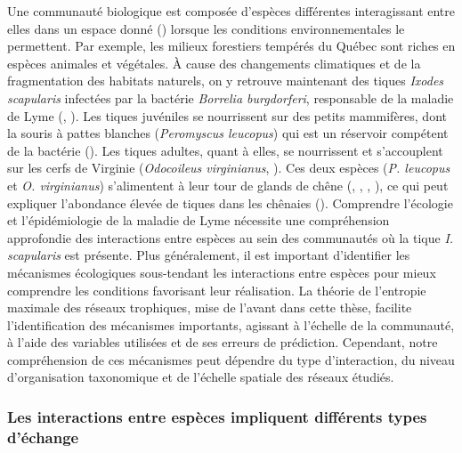 Une communauté biologique est composée d'espèces différentes interagissant entre
elles dans un espace donné (\cite{Stroud2015Community}) lorsque les conditions
environnementales le permettent. Par exemple, les milieux forestiers tempérés du
Québec sont riches en espèces animales et végétales. À cause des changements
climatiques et de la fragmentation des habitats naturels, on y retrouve
maintenant des tiques \textit{Ixodes scapularis} infectées par la bactérie
\textit{Borrelia burgdorferi}, responsable de la maladie de Lyme
(\cite{Ogden2009Emergence}, \cite{Simon2014Climate}). Les tiques juvéniles se
nourrissent sur des petits mammifères, dont la souris à pattes blanches
(\textit{Peromyscus leucopus}) qui est un réservoir compétent de la bactérie
(\cite{Donahue1987Reservoir}). Les tiques adultes, quant à elles, se nourrissent
et s'accouplent sur les cerfs de Virginie (\textit{Odocoileus virginianus},
\cite{Lane1991Lyme}). Ces deux espèces (\textit{P. leucopus} et \textit{O.
virginianus}) s'alimentent à leur tour de glands de chêne
(\cite{McShea1993Variablea}, \cite{Elkinton1996Interactions},
\cite{Wolff1996Population}, \cite{McShea2000Influence}), ce qui peut expliquer
l'abondance élevée de tiques dans les chênaies (\cite{Ostfeld2006Climate}).
Comprendre l'écologie et l'épidémiologie de la maladie de Lyme nécessite une
compréhension approfondie des interactions entre espèces au sein des communautés
où la tique \textit{I. scapularis} est présente. Plus généralement, il est
important d'identifier les mécanismes écologiques sous-tendant les interactions
entre espèces pour mieux comprendre les conditions favorisant leur réalisation.
La théorie de l'entropie maximale des réseaux trophiques, mise de l'avant dans
cette thèse, facilite l'identification des mécanismes importants, agissant à
l'échelle de la communauté, à l'aide des variables utilisées et de ses erreurs
de prédiction. Cependant, notre compréhension de ces mécanismes peut dépendre du
type d'interaction, du niveau d'organisation taxonomique et de l'échelle
spatiale des réseaux étudiés. 

\subsubsection{Les interactions entre espèces impliquent différents types d'échange} 

